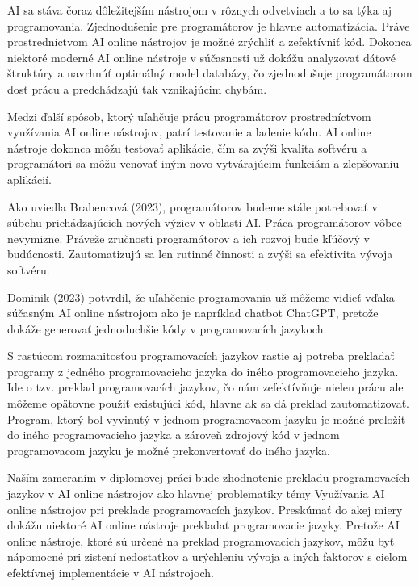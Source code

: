 AI sa stáva čoraz dôležitejším nástrojom v rôznych odvetviach a to sa týka aj programovania.  Zjednodušenie pre programátorov je hlavne automatizácia.  Práve prostredníctvom AI online nástrojov je možné zrýchliť a zefektívniť kód.  Dokonca niektoré moderné AI online nástroje v súčasnosti už dokážu analyzovať dátové štruktúry a navrhnúť optimálný model databázy, čo zjednodušuje programátorom dosť prácu a predchádzajú tak vznikajúcim chybám. \cite{brabencova_programatori_2023}
\par Medzi ďalší spôsob, ktorý uľahčuje prácu programátorov prostredníctvom využívania AI online nástrojov, patrí testovanie a ladenie kódu. AI online nástroje dokonca môžu testovať aplikácie, čím sa zvýši kvalita softvéru a programátori sa môžu venovať iným novo-vytvárajúcim funkciám a zlepšovaniu aplikácií. \cite{brabencova_programatori_2023}
\par Ako uviedla Brabencová (2023), programátorov budeme stále potrebovať v súbehu prichádzajúcich nových výziev v oblasti AI. Práca programátorov vôbec nevymizne. Práveže zručnosti programátorov a ich rozvoj bude kľúčový v budúcnosti. Zautomatizujú sa len rutinné činnosti a zvýši sa efektivita vývoja softvéru. \cite{brabencova_programatori_2023}
\par Dominik (2023) potvrdil, že uľahčenie programovania už môžeme vidieť vďaka súčasným AI online nástrojom ako je napríklad chatbot ChatGPT, pretože dokáže generovať jednoduchšie kódy v programovacích jazykoch.  \cite{dominik_ai_programovanie}
\par S rastúcom rozmanitosťou programovacích jazykov rastie aj potreba prekladať programy z jedného programovacieho jazyka do iného programovacieho jazyka.  Ide o tzv. preklad programovacích jazykov, čo nám zefektívňuje nielen prácu ale môžeme opätovne použiť existujúci kód, hlavne ak sa dá preklad zautomatizovať.  Program, ktorý bol vyvinutý v jednom programovacom jazyku je možné preložiť do iného programovacieho jazyka a zároveň zdrojový kód v jednom programovacom jazyku je možné prekonvertovať do iného jazyka.\cite{kj_preklad_jazyka}
\par Naším zameraním v diplomovej práci bude zhodnotenie prekladu programovacích jazykov v AI online nástrojov ako hlavnej problematiky témy Využívania AI online nástrojov pri preklade programovacích jazykov. Preskúmať do akej miery dokážu niektoré AI online nástroje prekladať programovacie jazyky. Pretože AI online nástroje, ktoré sú určené na preklad programovacích jazykov, môžu byť nápomocné pri zistení nedostatkov a urýchleniu vývoja a iných faktorov s cieľom efektívnej implementácie v AI nástrojoch.



